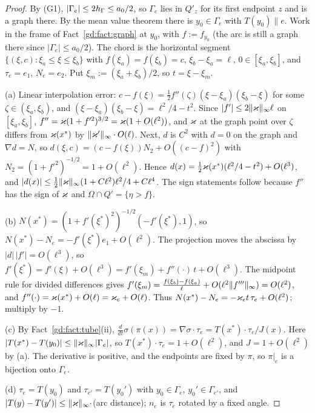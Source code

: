 \begin{proof}
By (G1), $|\Gamma_e|\le2h_\Gamma\le a_0/2$, so $\Gamma_e$ lies in $Q'_{z}$ for its first endpoint $z$ and is a graph there. By the mean value theorem there is $y_0\in\Gamma_e$ with $T(y_0)\parallel e$. Work in the frame of Fact~\ref{gd:fact:graph} at $y_0$, with $f:=f_{y_0}$ (the arc is still a graph there since $|\Gamma_e|\le a_0/2$). The chord is the horizontal segment $\{(\xi,c):\xi_a\le\xi\le\xi_b\}$ with $f(\xi_a)=f(\xi_b)=c$, $\xi_b-\xi_a=\ell$, $0\in[\xi_a,\xi_b]$, and $\tau_e=e_1$, $N_e=e_2$. Put $\xi_m:=(\xi_a+\xi_b)/2$, so $t=\xi-\xi_m$.

(a) Linear interpolation error: $c-f(\xi)=\tfrac12f''(\zeta)(\xi-\xi_a)(\xi_b-\xi)$ for some $\zeta\in(\xi_a,\xi_b)$, and $(\xi-\xi_a)(\xi_b-\xi)=\ell^2/4-t^2$. Since $|f'|\le2\lVert \varkappa\rVert_\infty\ell$ on $[\xi_a,\xi_b]$, $f''=\varkappa(1+f'^2)^{3/2}=\varkappa(1+O(\ell^2))$, and $\varkappa$ at the graph point over $\zeta$ differs from $\varkappa(x^\ast)$ by $\lVert \varkappa'\rVert_\infty\cdot O(\ell)$. Next, $d$ is $C^2$ with $d=0$ on the graph and $\nabla d=N$, so $d(\xi,c)=(c-f(\xi))N_2+O((c-f)^2)$ with $N_2=(1+f'^2)^{-1/2}=1+O(\ell^2)$. Hence $d(x)=\frac12\varkappa(x^\ast)(\ell^2/4-t^2)+O(\ell^3)$, and $|d(x)|\le\frac12\lVert \varkappa\rVert_\infty(1+C\ell^2)\ell^2/4+C\ell^4$. The sign statements follow because $f''$ has the sign of $\varkappa$ and $\Omega\cap Q'=\{\eta>f\}$.

(b) $N(x^\ast)=(1+f'(\xi^\ast)^2)^{-1/2}(-f'(\xi^\ast),1)$, so $N(x^\ast)-N_e=-f'(\xi^\ast)e_1+O(\ell^2)$. The projection moves the abscissa by $|d|\,|f'|=O(\ell^3)$, so $f'(\xi^\ast)=f'(\xi)+O(\ell^3)=f'(\xi_m)+f''(\cdot)\,t+O(\ell^3)$. The midpoint rule for divided differences gives $f'(\xi_m)=\frac{f(\xi_b)-f(\xi_a)}{\ell}+O(\ell^2\lVert f'''\rVert_\infty)=O(\ell^2)$, and $f''(\cdot)=\varkappa(x^\ast)+O(\ell)=\varkappa_e+O(\ell)$. Thus $N(x^\ast)-N_e=-\varkappa_e t\,\tau_e+O(\ell^2)$; multiply by $-1$.

(c) By Fact~\ref{gd:fact:tube}(ii), $\frac{d}{dt}\sigma(\pi(x))=\nabla\sigma\cdot\tau_e=T(x^\ast)\cdot\tau_e/J(x)$. Here $|T(x^\ast)-T(y_0)|\le\lVert \varkappa\rVert_\infty|\Gamma_e|$, so $T(x^\ast)\cdot\tau_e=1+O(\ell^2)$, and $J=1+O(\ell^2)$ by (a). The derivative is positive, and the endpoints are fixed by $\pi$, so $\pi|_e$ is a bijection onto $\Gamma_e$.

(d) $\tau_e=T(y_0)$ and $\tau_{e'}=T(y_0')$ with $y_0\in\Gamma_e$, $y_0'\in\Gamma_{e'}$, and $|T(y)-T(y')|\le\lVert \varkappa\rVert_\infty\cdot$(arc distance); $n_e$ is $\tau_e$ rotated by a fixed angle.
\end{proof}

